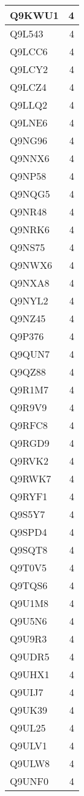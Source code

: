 \documentclass[
]{book}
\theoremstyle{definition}
\theoremstyle{definition}
\theoremstyle{definition}
\theoremstyle{definition}
\theoremstyle{remark}
\begin{document}
\begin{table}
\begin{tabular}{l|r}
\hline
Q9KWU1 & 4\\
\hline
Q9L543 & 4\\
\hline
Q9LCC6 & 4\\
\hline
Q9LCY2 & 4\\
\hline
Q9LCZ4 & 4\\
\hline
Q9LLQ2 & 4\\
\hline
Q9LNE6 & 4\\
\hline
Q9NG96 & 4\\
\hline
Q9NNX6 & 4\\
\hline
Q9NP58 & 4\\
\hline
Q9NQG5 & 4\\
\hline
Q9NR48 & 4\\
\hline
Q9NRK6 & 4\\
\hline
Q9NS75 & 4\\
\hline
Q9NWX6 & 4\\
\hline
Q9NXA8 & 4\\
\hline
Q9NYL2 & 4\\
\hline
Q9NZ45 & 4\\
\hline
Q9P376 & 4\\
\hline
Q9QUN7 & 4\\
\hline
Q9QZ88 & 4\\
\hline
Q9R1M7 & 4\\
\hline
Q9R9V9 & 4\\
\hline
Q9RFC8 & 4\\
\hline
Q9RGD9 & 4\\
\hline
Q9RVK2 & 4\\
\hline
Q9RWK7 & 4\\
\hline
Q9RYF1 & 4\\
\hline
Q9S5Y7 & 4\\
\hline
Q9SPD4 & 4\\
\hline
Q9SQT8 & 4\\
\hline
Q9T0V5 & 4\\
\hline
Q9TQS6 & 4\\
\hline
Q9U1M8 & 4\\
\hline
Q9U5N6 & 4\\
\hline
Q9U9R3 & 4\\
\hline
Q9UDR5 & 4\\
\hline
Q9UHX1 & 4\\
\hline
Q9UIJ7 & 4\\
\hline
Q9UK39 & 4\\
\hline
Q9UL25 & 4\\
\hline
Q9ULV1 & 4\\
\hline
Q9ULW8 & 4\\
\hline
Q9UNF0 & 4\\

\end{tabular}
\end{table}
\end{document}
